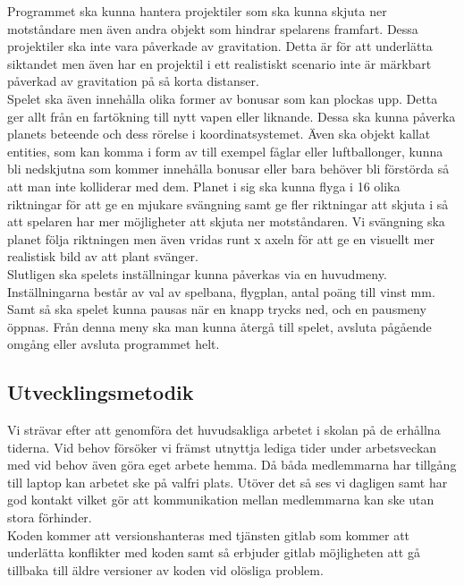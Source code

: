 \documentclass[12pt,a4paper]{article}
\begin{document}
Programmet ska kunna hantera projektiler som ska kunna skjuta ner motståndare men även andra objekt som hindrar spelarens framfart. Dessa projektiler ska inte vara påverkade av gravitation. Detta är för att underlätta siktandet men även har en projektil i ett realistiskt scenario inte är märkbart påverkad av gravitation på så korta distanser. \\

Spelet ska även innehålla olika former av bonusar som kan plockas upp. Detta ger allt från en fartökning till nytt vapen eller liknande. Dessa ska kunna påverka planets beteende och dess rörelse i koordinatsystemet.  Även ska objekt kallat entities, som kan komma i form av till exempel fåglar eller luftballonger, kunna bli nedskjutna som kommer innehålla bonusar eller bara behöver bli förstörda så att man inte kolliderar med dem. 
Planet i sig ska kunna flyga i 16 olika riktningar för att ge en mjukare svängning samt ge fler riktningar att skjuta i så att spelaren har mer möjligheter att skjuta ner motståndaren. Vi svängning ska planet följa riktningen men även vridas runt x axeln för att ge en visuellt mer realistisk bild av att plant svänger. \\

Slutligen ska spelets inställningar kunna påverkas via en huvudmeny. Inställningarna består av val av spelbana, flygplan, antal poäng till vinst mm. Samt så ska spelet kunna pausas när en knapp trycks ned, och en pausmeny öppnas. Från denna meny ska man kunna återgå till spelet, avsluta pågående omgång eller avsluta programmet helt. \\


\subsection{Utvecklingsmetodik}
Vi strävar efter att genomföra det huvudsakliga arbetet i skolan på de erhållna tiderna. Vid behov försöker vi främst utnyttja lediga tider under arbetsveckan med vid behov även göra eget arbete hemma. Då båda medlemmarna har tillgång till laptop kan arbetet ske på valfri plats. Utöver det så ses vi dagligen samt har god kontakt vilket gör att kommunikation mellan medlemmarna kan ske utan stora förhinder. \\

Koden kommer att versionshanteras med tjänsten gitlab som kommer att underlätta konflikter med koden samt så erbjuder gitlab möjligheten att gå tillbaka till äldre versioner av koden vid olösliga problem.
\end{document}
